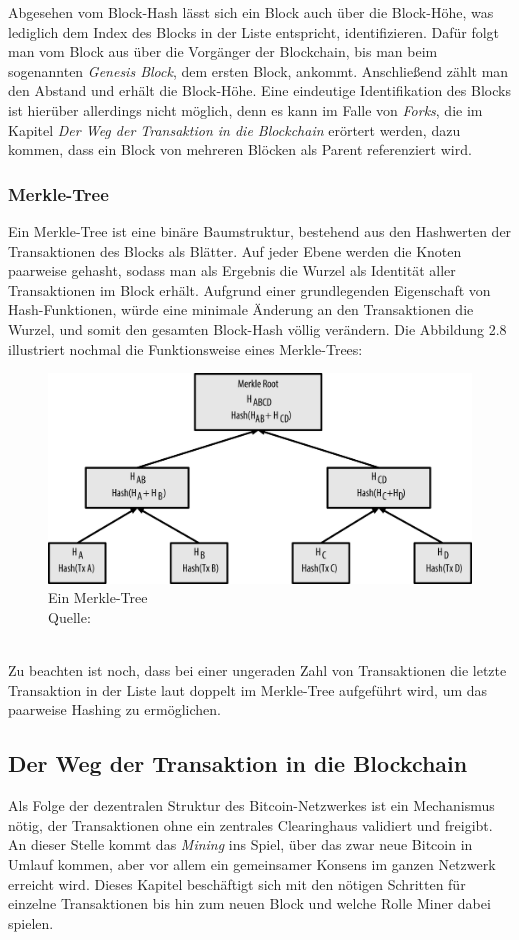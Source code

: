 Abgesehen vom Block-Hash lässt sich ein Block auch über die Block-Höhe, was lediglich dem Index des Blocks in der Liste entspricht, identifizieren. 
Dafür folgt man vom Block aus über die Vorgänger der Blockchain, bis man beim sogenannten \emph{Genesis Block}, dem ersten Block, ankommt. 
Anschließend zählt man den Abstand und erhält die Block-Höhe.
Eine eindeutige Identifikation des Blocks ist hierüber allerdings nicht möglich, denn es kann im Falle von \emph{Forks}, die im Kapitel \emph{Der Weg der Transaktion in die Blockchain} erörtert werden, dazu kommen, dass ein Block von mehreren Blöcken als Parent referenziert wird.\\
\subsubsection{Merkle-Tree}
Ein Merkle-Tree ist eine binäre Baumstruktur, bestehend aus den Hashwerten der Transaktionen des Blocks als Blätter. 
Auf jeder Ebene werden die Knoten paarweise gehasht, sodass man als Ergebnis die Wurzel als Identität aller Transaktionen im Block erhält. 
Aufgrund einer grundlegenden Eigenschaft von Hash-Funktionen, würde eine minimale Änderung an den Transaktionen die Wurzel, und somit den gesamten Block-Hash völlig verändern. Die Abbildung 2.8 illustriert nochmal die Funktionsweise eines Merkle-Trees:
\begin{figure}[htpb]
	\centering
	\includegraphics[width=\textwidth]{images/merkle.png}
	\caption{Ein Merkle-Tree\\
		Quelle: \cite[S. 201]{antanopoulos_2014}}
	\label{6braun:fig:merkle}
\end{figure}\\
Zu beachten ist noch, dass bei einer ungeraden Zahl von Transaktionen die letzte Transaktion in der Liste laut \cite{antanopoulos_2014} doppelt im Merkle-Tree aufgeführt wird, um das paarweise Hashing zu ermöglichen.
\subsection{Der Weg der Transaktion in die Blockchain}
Als Folge der dezentralen Struktur des Bitcoin-Netzwerkes ist ein Mechanismus nötig, der Transaktionen ohne ein zentrales Clearinghaus validiert und freigibt. An dieser Stelle kommt das \emph{Mining} ins Spiel, über das zwar neue Bitcoin in Umlauf kommen, aber vor allem ein gemeinsamer Konsens im ganzen Netzwerk erreicht wird.
Dieses Kapitel beschäftigt sich mit den nötigen Schritten für einzelne Transaktionen bis hin zum neuen Block und welche Rolle Miner dabei spielen.
